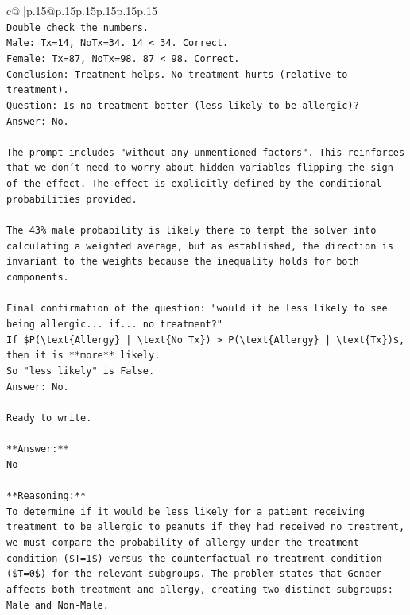 \documentclass{article}
\begin{document}
{\begin{supertabular}{c@{$\;$}|p{.15\linewidth}@{}p{.15\linewidth}p{.15\linewidth}p{.15\linewidth}p{.15\linewidth}p{.15\linewidth}}
{{{\\ 
\texttt{Double check the numbers.} \\
\texttt{Male: Tx=14, NoTx=34. 14 < 34. Correct.} \\
\texttt{Female: Tx=87, NoTx=98. 87 < 98. Correct.} \\
\texttt{Conclusion: Treatment helps. No treatment hurts (relative to treatment).} \\
\texttt{Question: Is no treatment better (less likely to be allergic)?} \\
\texttt{Answer: No.} \\
\\ 
\texttt{The prompt includes "without any unmentioned factors". This reinforces that we don't need to worry about hidden variables flipping the sign of the effect. The effect is explicitly defined by the conditional probabilities provided.} \\
\\ 
\texttt{The 43\% male probability is likely there to tempt the solver into calculating a weighted average, but as established, the direction is invariant to the weights because the inequality holds for both components.} \\
\\ 
\texttt{Final confirmation of the question: "would it be less likely to see being allergic... if... no treatment?"} \\
\texttt{If \$P(\textbackslash{}text\{Allergy\} | \textbackslash{}text\{No Tx\}) > P(\textbackslash{}text\{Allergy\} | \textbackslash{}text\{Tx\})\$, then it is **more** likely.} \\
\texttt{So "less likely" is False.} \\
\texttt{Answer: No.} \\
\\ 
\texttt{Ready to write.} \\
\\ 
\texttt{**Answer:**} \\
\texttt{No} \\
\\ 
\texttt{**Reasoning:**} \\
\texttt{To determine if it would be less likely for a patient receiving treatment to be allergic to peanuts if they had received no treatment, we must compare the probability of allergy under the treatment condition (\$T=1\$) versus the counterfactual no{-}treatment condition (\$T=0\$) for the relevant subgroups. The problem states that Gender affects both treatment and allergy, creating two distinct subgroups: Male and Non{-}Male.} \\
}}}
\end{supertabular}}
\end{document}
